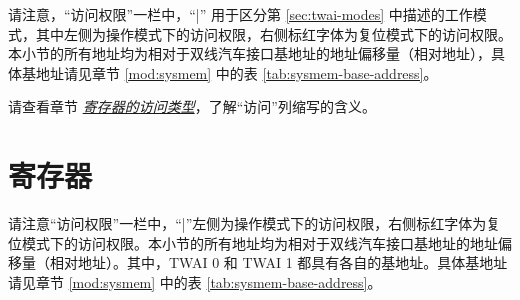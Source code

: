 \documentclass[main\_\_CN.tex]{subfiles}
\begin{document}
请注意，“访问权限”一栏中，“|” 用于区分第 \ref{sec:twai-modes} 中描述的工作模式，其中左侧为操作模式下的访问权限，右侧标红字体为复位模式下的访问权限。本小节的所有地址均为相对于双线汽车接口基地址的地址偏移量（相对地址），具体基地址请见章节 \ref{mod:sysmem} \textit{} 中的表 \ref{tab:sysmem-base-address}。

请查看章节 \hyperref[glossary-access-types]{\textit{寄存器的访问类型}}，了解“访问”列缩写的含义。






\clearpage
\section{寄存器}

请注意“访问权限”一栏中，“|”左侧为操作模式下的访问权限，右侧标红字体为复位模式下的访问权限。本小节的所有地址均为相对于双线汽车接口基地址的地址偏移量（相对地址）。其中，TWAI 0 和 TWAI 1 都具有各自的基地址。具体基地址请见章节 \ref{mod:sysmem} \textit{} 中的表 \ref{tab:sysmem-base-address}。


\end{document}
